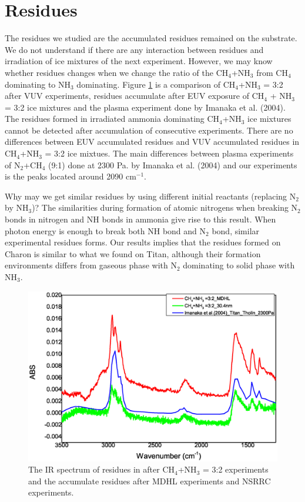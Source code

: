 \section{Residues}
The residues we studied are the accumulated residues remained on the substrate. We do not understand if there are any interaction between residues and irradiation of ice mixtures of the next experiment. However, we may know whether residues changes when we change the ratio of the CH$_4$+NH$_3$ from CH$_4$ dominating to NH$_3$ dominating.  Figure \ref{fig:residues} is a comparison of CH$_4$+NH$_3$ = 3:2 after VUV experiments, residues accumulate after EUV exposure of CH$_4$ + NH$_3$ = 3:2 ice mixtures and the plasma experiment done by Imanaka et al. (2004)\cite{imanaka2004laboratory}. The residues formed in irradiated ammonia dominating CH$_4$+NH$_3$ ice mixtures cannot be detected after accumulation of consecutive experiments. There are no differences between EUV accumulated residues and VUV accumulated residues in CH$_4$+NH$_3$ = 3:2 ice mixtues. The main differences between plasma experiments of N$_2$+CH$_4$ (9:1) done at 2300 Pa. by Imanaka et al. (2004)\cite{imanaka2004laboratory} and our experiments is the peaks located around 2090 cm$^{-1}$.

Why may we get similar residues by using different initial reactants (replacing N$_2$ by NH$_3$)? The similarities during formation of atomic nitrogens when breaking N$_2$ bonds in nitrogen and NH bonds in ammonia give rise to this result. When photon energy is enough to break both NH bond and N$_2$ bond, similar experimental residues forms. Our results implies that the residues formed on Charon is similar to what we found on Titan, although their formation environments differs from gaseous phase with N$_2$ dominating to solid phase with NH$_3$.


\begin{figure}
\centering
\includegraphics[width=\textwidth]{figures/chapter3/residue.eps}
\caption{The IR spectrum of residues in after CH$_4$+NH$_3$ = 3:2 experiments and the accumulate residues after MDHL experiments and NSRRC experiments.}
\label{fig:residues}
\end{figure}



